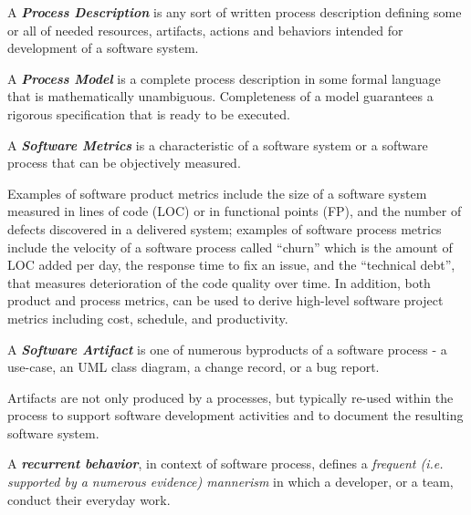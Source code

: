 \begin{defn}\label{def_process_desc}
A \textbf{\textit{Process Description}} is any sort of written process description defining 
some or all of needed resources, artifacts, actions and behaviors intended for development 
of a software system.
\end{defn}

\begin{defn}\label{def_process_model}
A \textbf{\textit{Process Model}} is a complete process description in some formal language 
that is mathematically unambiguous. Completeness of a model guarantees a rigorous specification
that is ready to be executed.
\end{defn}

\begin{defn}\label{def_metrics}
A \textbf{\textit{Software Metrics}} is a characteristic of a software system or a software process that can be 
objectively measured.
\end{defn}
Examples of software product metrics include the size of a software system measured in lines of code (LOC) or 
in functional points (FP), and the number of defects discovered in a delivered system; 
examples of software process metrics include the velocity of a software process called ``churn'' which is the 
amount of LOC added per day, the response time to fix an issue, and the ``technical debt'', 
that measures deterioration of the code quality over time. 
In addition, both product and process metrics, can be used to derive high-level software project metrics including 
cost, schedule, and productivity.

\begin{defn}\label{def_artifact}
A \textbf{\textit{Software Artifact}} is one of numerous byproducts of a software process - a use-case, 
an UML class diagram, a change record, or a bug report. 
\end{defn}
Artifacts are not only produced by a processes, but typically re-used within the process to support 
software development activities and to document the resulting software system.

\begin{defn}\label{def_behavior}
A \textbf{\textit{recurrent behavior}}, in context of software process, defines a \textit{frequent 
(i.e. supported by a numerous evidence) mannerism} in which a developer, or a team, conduct their everyday work.
\end{defn}

%
%

